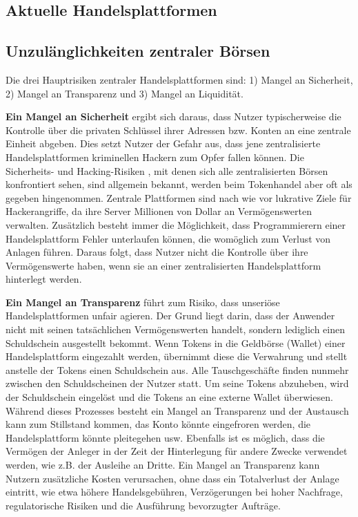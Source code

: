 \documentclass[UTF8,nofonts]{article}
\begin{document}
\begin{multicols}{2}
\section{Aktuelle Handelsplattformen\label{sec:current_exchange_landscape}}

\subsection{Unzulänglichkeiten zentraler Börsen}
Die drei Hauptrisiken zentraler Handelsplattformen sind: 1) Mangel an Sicherheit, 2) Mangel an Transparenz und 3) Mangel an Liquidität.

\textbf{Ein Mangel an Sicherheit} ergibt sich daraus, dass Nutzer typischerweise die Kontrolle über die privaten Schlüssel ihrer Adressen bzw. Konten an eine zentrale Einheit abgeben. Dies setzt Nutzer der Gefahr aus, dass jene zentralisierte Handelsplattformen kriminellen Hackern zum Opfer fallen können. Die Sicherheits- und Hacking-Risiken \cite{coincheckhack}  \cite{mcmillan2014inside}, mit denen sich alle zentralisierten Börsen konfrontiert sehen, sind allgemein bekannt, werden beim Tokenhandel aber oft als gegeben hingenommen. Zentrale Plattformen sind nach wie vor lukrative Ziele für Hackerangriffe, da ihre Server Millionen von Dollar an Vermögenswerten verwalten. Zusätzlich besteht immer die Möglichkeit, dass Programmierern einer Handelsplattform Fehler unterlaufen können, die womöglich zum Verlust von Anlagen führen. Daraus folgt, dass Nutzer nicht die Kontrolle über ihre Vermögenswerte haben, wenn sie an einer zentralisierten Handelsplattform hinterlegt werden.

\textbf{Ein Mangel an Transparenz} führt zum Risiko, dass unseriöse Handelsplattformen unfair agieren. Der Grund liegt darin, dass der Anwender nicht mit seinen tatsächlichen Vermögenswerten handelt, sondern lediglich einen Schuldschein ausgestellt bekommt. Wenn Tokens in die Geldbörse (Wallet) einer Handelsplattform eingezahlt werden, übernimmt diese die Verwahrung und stellt anstelle der Tokens einen Schuldschein aus. Alle Tauschgeschäfte finden nunmehr zwischen den Schuldscheinen der Nutzer statt. Um seine Tokens abzuheben, wird der Schuldschein eingelöst und die Tokens an eine externe Wallet überwiesen. Während dieses Prozesses besteht ein Mangel an Transparenz und der Austausch kann zum Stillstand kommen, das Konto könnte eingefroren werden, die Handelsplattform könnte pleitegehen usw. Ebenfalls ist es möglich, dass die Vermögen der Anleger in der Zeit der Hinterlegung für andere Zwecke verwendet werden, wie z.B. der Ausleihe an Dritte. Ein Mangel an Transparenz kann Nutzern zusätzliche Kosten verursachen, ohne dass ein Totalverlust der Anlage eintritt, wie etwa höhere Handelsgebühren, Verzögerungen bei hoher Nachfrage, regulatorische Risiken und die Ausführung bevorzugter Aufträge.


\end{multicols}
\end{document}
